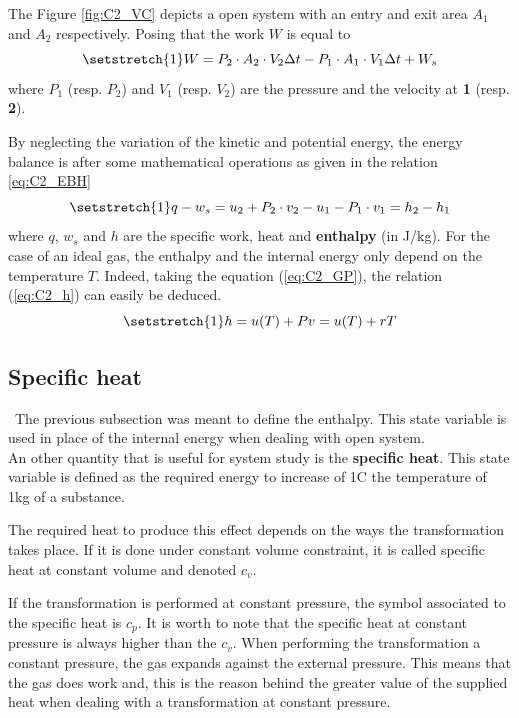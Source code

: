 The Figure \ref{fig:C2_VC} depicts a open system with an entry and exit area $A_1$ and $A_2$ respectively. Posing that the work $W$ is equal to 
\begin{equation}
\setstretch{1}
W = P_2\cdot A_2\cdot V_2\Delta t - P_1\cdot A_1\cdot V_1\Delta t + W_s
\end{equation}      
where $P_1$ (resp. $P_2$) and $V_1$ (resp. $V_2$) are the pressure and the velocity at \textbf{1} (resp. \textbf{2}).

By neglecting the variation of the kinetic and potential energy, the energy balance is after some mathematical operations as given in the relation \ref{eq:C2_EBH}
\begin{equation}
\setstretch{1}
q - w_s = u_2 +P_2\cdot v_2 - u_1 - P_1\cdot v_1 = h_2 - h_1\label{eq:C2_EBH}
\end{equation}
where $q$, $w_s$ and $h$ are the specific work, heat and \textbf{enthalpy} (in J/kg).  
For the case of an ideal gas, the enthalpy and the internal energy only depend on the temperature $T$. Indeed, taking the equation (\ref{eq:C2_GP}), the relation (\ref{eq:C2_h}) can easily be deduced.
\begin{equation}
\setstretch{1}
h = u(T) + Pv = u(T) + rT \label{eq:C2_h}
\end{equation}
\subsection{Specific heat}
\quad\, The previous subsection was meant to define the enthalpy. This state variable is used in place of the internal energy when dealing with open system.\\

An other quantity that is useful for system study is the \textbf{specific heat}. This state variable is defined as the required energy to increase of 1\degree C the temperature of 1kg of a substance. 
 
The required heat to produce this effect depends on the ways the transformation takes place. 
If it is done under constant volume constraint, it is called specific heat at constant volume and denoted $c_v$. 

If the transformation is performed at constant pressure, the symbol associated to the specific heat is $c_p$.
It is worth to note that the specific heat at constant pressure is always higher than the $c_v$. When performing the transformation a constant pressure, the gas expands against the external pressure. This means that the gas does work and, this is the reason behind the greater value of the supplied heat when dealing with a transformation at constant pressure. 

